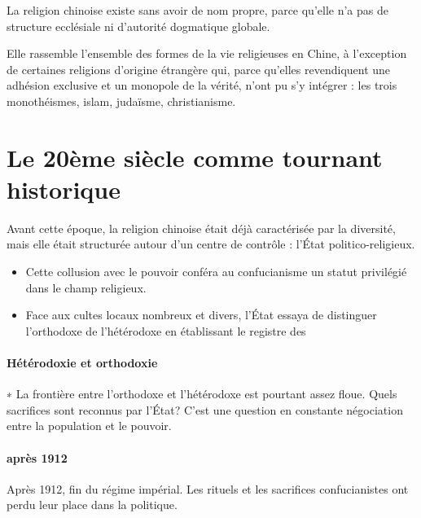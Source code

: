 \begin{Prop}






La religion chinoise existe sans avoir de nom propre, parce qu’elle n’a pas de structure ecclésiale ni d’autorité dogmatique globale.


\end{Prop}

Elle rassemble l’ensemble des formes de la vie religieuses en Chine, à l’exception de certaines religions d’origine étrangère qui, parce qu’elles revendiquent une adhésion exclusive et un monopole de la vérité, n’ont pu s’y intégrer : les trois monothéismes, islam, judaïsme, christianisme. 

\section{Le 20ème siècle comme tournant historique}
 

Avant cette époque, la religion chinoise était déjà caractérisée par la diversité, mais elle était structurée autour d’un centre de contrôle : l’État politico-religieux.
\begin{itemize}

    \item  	Cette collusion avec le pouvoir conféra au confucianisme un statut privilégié dans le champ religieux.
    \item	Face aux cultes locaux nombreux et divers, l’État essaya de distinguer l’orthodoxe de l’hétérodoxe en établissant le registre des  

  \end{itemize}

\paragraph{Hétérodoxie et orthodoxie} ∗ La frontière entre l’orthodoxe et l’hétérodoxe est pourtant assez floue. Quels sacrifices sont reconnus par l’État? C’est une question en constante négociation entre la population et le pouvoir.

\paragraph{après 1912}Après 1912, fin du régime impérial.
Les rituels et les sacrifices confucianistes ont perdu leur place dans la politique.

